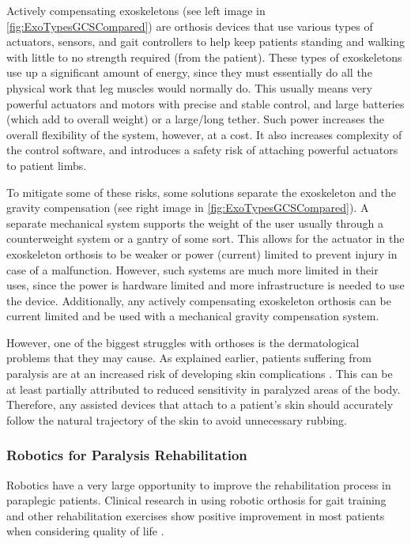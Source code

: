 Actively compensating exoskeletons (see left image in \autoref{fig:ExoTypesGCSCompared}) are orthosis devices that use various types of actuators, sensors, and gait controllers to help keep patients standing and walking with little to no strength required (from the patient). These types of exoskeletons use up a significant amount of energy, since they must essentially do all the physical work that leg muscles would normally do. This usually means very powerful actuators and motors with precise and stable control, and large batteries (which add to overall weight) or a large/long tether. Such power increases the overall flexibility of the system, however, at a cost. It also increases complexity of the control software, and introduces a safety risk of attaching powerful actuators to patient limbs.

To mitigate some of these risks, some solutions separate the exoskeleton and the gravity compensation (see right image in \autoref{fig:ExoTypesGCSCompared}). A separate mechanical system supports the weight of the user usually through a counterweight system or a gantry of some sort. This allows for the actuator in the exoskeleton orthosis to be weaker or power (current) limited to prevent injury in case of a malfunction. However, such systems are much more limited in their uses, since the power is hardware limited and more infrastructure is needed to use the device. Additionally, any actively compensating exoskeleton orthosis can be current limited and be used with a mechanical gravity compensation system. 

However, one of the biggest struggles with orthoses is the dermatological problems that they may cause. As explained earlier, patients suffering from paralysis are at an increased risk of developing skin complications \cite{DermatologicalIssuesParalysis}. This can be at least partially attributed to reduced sensitivity in paralyzed areas of the body. Therefore, any assisted devices that attach to a patient's skin should accurately follow the natural trajectory of the skin to avoid unnecessary rubbing.

\subsubsection{Robotics for Paralysis Rehabilitation}
Robotics have a very large opportunity to improve the rehabilitation process in paraplegic patients. Clinical research in using robotic orthosis for gait training and other rehabilitation exercises show positive improvement in most patients when considering quality of life \cite{GaitTrainingBenefitsRoboticsWalkbot} \cite{RoboticGaitTraining}. 

